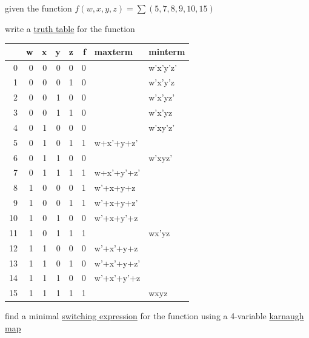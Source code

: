 \documentclass[a4paper,12pt]{article}
\begin{document}
\newenvironment{note}
  {\begin{bclogo}[logo=\bcinfo, couleurBarre=orange, couleur=lightgray]{ note}}
  {\end{bclogo}}
\newenvironment{attention}
  {\begin{bclogo}[logo=\bcattention, couleurBarre=red, noborder=true, 
                couleur=red!15]{Important!}}
  {\end{bclogo}}

\begin{question}
given the function \(f(w,x,y,z) = \sum(5,7,8,9,10,15)\)\\[0pt]
\begin{subquestion}
write a \href{20230116122956-truth_table.org}{truth table} for the function\\[0pt]
\begin{answer}
\begin{center}
\begin{tabular}{rrrrrrll}
 & w & x & y & z & f & maxterm & minterm\\[0pt]
\hline
0 & 0 & 0 & 0 & 0 & 0 &  & w'x'y'z'\\[0pt]
1 & 0 & 0 & 0 & 1 & 0 &  & w'x'y'z\\[0pt]
2 & 0 & 0 & 1 & 0 & 0 &  & w'x'yz'\\[0pt]
3 & 0 & 0 & 1 & 1 & 0 &  & w'x'yz\\[0pt]
4 & 0 & 1 & 0 & 0 & 0 &  & w'xy'z'\\[0pt]
5 & 0 & 1 & 0 & 1 & 1 & w+x'+y+z' & \\[0pt]
6 & 0 & 1 & 1 & 0 & 0 &  & w'xyz'\\[0pt]
7 & 0 & 1 & 1 & 1 & 1 & w+x'+y'+z' & \\[0pt]
8 & 1 & 0 & 0 & 0 & 1 & w'+x+y+z & \\[0pt]
9 & 1 & 0 & 0 & 1 & 1 & w'+x+y+z' & \\[0pt]
10 & 1 & 0 & 1 & 0 & 0 & w'+x+y'+z & \\[0pt]
11 & 1 & 0 & 1 & 1 & 1 &  & wx'yz\\[0pt]
12 & 1 & 1 & 0 & 0 & 0 & w'+x'+y+z & \\[0pt]
13 & 1 & 1 & 0 & 1 & 0 & w'+x'+y+z' & \\[0pt]
14 & 1 & 1 & 1 & 0 & 0 & w'+x'+y'+z & \\[0pt]
15 & 1 & 1 & 1 & 1 & 1 &  & wxyz\\[0pt]
\end{tabular}
\end{center}
\end{answer}
\end{subquestion}
\begin{subquestion}
find a minimal \href{boolean_algebra.org}{switching expression} for the function using a 4-variable \href{boolean_algebra.org}{karnaugh map}\\[0pt]
\begin{answer}
\begin{center}

\end{center}


\end{answer}
\end{subquestion}
\end{question}
\end{document}
